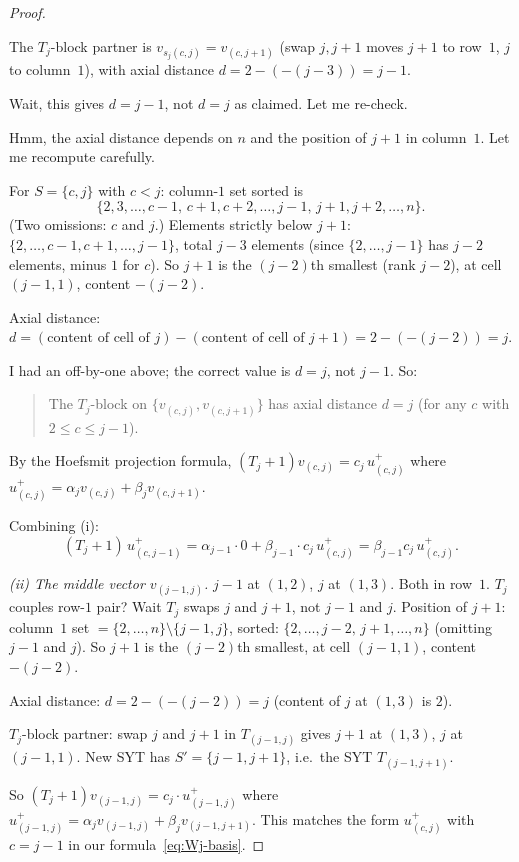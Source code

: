 \documentclass[11pt]{article}
\theoremstyle{definition}
\begin{document}
\begin{proof}
\begin{itemize}[leftmargin=2em,topsep=0.3em,itemsep=0.2em]
The $T_j$-block partner is $v_{s_j(c,j)} = v_{(c,j+1)}$ (swap $j,j+1$
moves $j+1$ to row~$1$, $j$ to column~$1$), with axial distance
$d=2-(-(j-3))=j-1$.

Wait, this gives $d=j-1$, not $d=j$ as claimed.  Let me re-check.
\end{itemize}

Hmm, the axial distance depends on $n$ and the position of $j+1$ in
column~$1$.  Let me recompute carefully.

For $S=\{c,j\}$ with $c<j$: column-$1$ set sorted is
\[
   \{2,3,\ldots,c-1,\,c+1,c+2,\ldots,j-1,\,j+1,j+2,\ldots,n\}.
\]
(Two omissions: $c$ and $j$.)  Elements strictly below $j+1$:
$\{2,\ldots,c-1,c+1,\ldots,j-1\}$, total $j-3$ elements (since
$\{2,\ldots,j-1\}$ has $j-2$ elements, minus $1$ for $c$).  So $j+1$
is the $(j-2)$th smallest (rank $j-2$), at cell $(j-1,1)$, content
$-(j-2)$.

Axial distance: $d = (\text{content of cell of }j) - (\text{content of cell of }j{+}1) = 2 - (-(j-2)) = j$.

I had an off-by-one above; the correct value is $d=j$, not $j-1$. So:

\begin{quote}
The $T_j$-block on $\{v_{(c,j)},v_{(c,j+1)}\}$ has axial distance $d=j$
(for any $c$ with $2\le c\le j-1$).
\end{quote}

By the Hoefsmit projection formula,
$(T_j{+}1)v_{(c,j)} = c_j\,u^+_{(c,j)}$ where
$u^+_{(c,j)}=\alpha_j v_{(c,j)}+\beta_j v_{(c,j+1)}$.

Combining (i):
\[
   (T_j{+}1)\,u^+_{(c,j-1)}
   = \alpha_{j-1}\cdot 0 + \beta_{j-1}\cdot c_j\, u^+_{(c,j)}
   = \beta_{j-1}c_j\, u^+_{(c,j)}.
\]

\emph{(ii) The middle vector $v_{(j-1,j)}$.}  $j-1$ at $(1,2)$,
$j$ at $(1,3)$.  Both in row~$1$.  $T_j$ couples row-$1$ pair?  Wait
$T_j$ swaps $j$ and $j+1$, not $j-1$ and $j$.  Position of $j+1$:
column~$1$ set $=\{2,\ldots,n\}\setminus\{j-1,j\}$, sorted:
$\{2,\ldots,j-2,\,j+1,\ldots,n\}$ (omitting $j-1$ and $j$).  So $j+1$
is the $(j-2)$th smallest, at cell $(j-1,1)$, content $-(j-2)$.

Axial distance: $d=2-(-(j-2))=j$ (content of $j$ at $(1,3)$ is $2$).

$T_j$-block partner: swap $j$ and $j+1$ in $T_{(j-1,j)}$ gives $j+1$ at
$(1,3)$, $j$ at $(j-1,1)$.  New SYT has $S'=\{j-1,j+1\}$, i.e.\ the
SYT $T_{(j-1,j+1)}$.

So $(T_j{+}1)v_{(j-1,j)} = c_j\cdot u^+_{(j-1,j)}$ where
$u^+_{(j-1,j)}=\alpha_j v_{(j-1,j)}+\beta_j v_{(j-1,j+1)}$.  This matches
the form $u^+_{(c,j)}$ with $c=j-1$ in our formula~\eqref{eq:Wj-basis}.


\end{proof}
\end{document}
